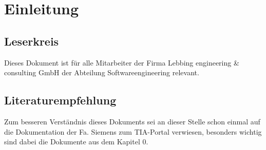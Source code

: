\chapter{Einleitung}\label{chap:Einleitung}

\section{Leserkreis}\label{sec:Leserkreis}

Dieses Dokument ist für alle Mitarbeiter der Firma Lebbing engineering \& consulting GmbH der Abteilung Softwareengineering relevant.

\section{Literaturempfehlung}\label{sec:Literaturempfehlung}

Zum besseren Verständnis dieses Dokuments sei an dieser Stelle schon einmal auf die Dokumentation der Fa. Siemens zum TIA-Portal verwiesen, besonders wichtig sind dabei die Dokumente aus dem Kapitel 0.
